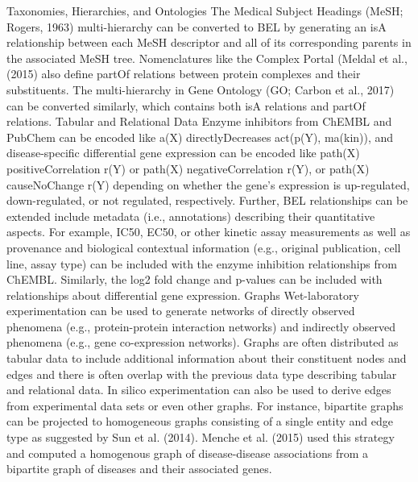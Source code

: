 \documentclass{bmcart}
\begin{document}
Taxonomies, Hierarchies, and Ontologies
The Medical Subject Headings (MeSH; Rogers, 1963) multi-hierarchy can be converted to BEL by generating an isA relationship between each MeSH descriptor and all of its corresponding parents in the associated MeSH tree. Nomenclatures like the Complex Portal (Meldal et al., (2015) also define partOf relations between protein complexes and their substituents. The multi-hierarchy in Gene Ontology (GO; Carbon et al., 2017) can be converted similarly, which contains both isA relations and partOf relations.
Tabular and Relational Data
Enzyme inhibitors from ChEMBL and PubChem can be encoded like a(X) directlyDecreases act(p(Y), ma(kin)), and disease-specific differential gene expression can be encoded like path(X) positiveCorrelation r(Y) or path(X) negativeCorrelation r(Y), or path(X) causeNoChange r(Y) depending on whether the gene's expression is up-regulated, down-regulated, or not regulated, respectively. Further, BEL relationships can be extended include metadata (i.e., annotations) describing their quantitative aspects. For example, IC50, EC50, or other kinetic assay measurements as well as provenance and biological contextual information (e.g., original publication, cell line, assay type) can be included with the enzyme inhibition relationships from ChEMBL. Similarly, the log2 fold change and p-values can be included with relationships about differential gene expression.
Graphs
Wet-laboratory experimentation can be used to generate networks of directly observed phenomena (e.g., protein-protein interaction networks) and indirectly observed phenomena (e.g., gene co-expression networks). Graphs are often distributed as tabular data to include additional information about their constituent nodes and edges and there is often overlap with the previous data type describing tabular and relational data. In silico experimentation can also be used to derive edges from experimental data sets or even other graphs. For instance, bipartite graphs can be projected to homogeneous graphs consisting of a single entity and edge type as suggested by Sun et al. (2014). Menche et al. (2015) used this strategy and computed a homogenous graph of disease-disease associations from a bipartite graph of diseases and their associated genes.


\end{document}
